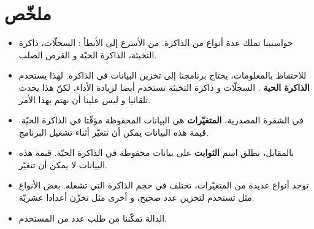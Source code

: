 \section*{ملخّص}
\begin{itemize}
  \item حواسيبنا تملك عدة أنواع من الذاكرة. من الأسرع إلى الأبطأ : السجلّات، ذاكرة التخبئة، الذاكرة الحيّة و القرص الصلب.
  \item للاحتفاظ بالمعلومات، يحتاج برنامجنا إلى تخزين البيانات في الذاكرة. لهذا يستخدم
\textbf{الذاكرة الحية}
. السجلّات و ذاكرة التخبئة تستخدم أيضا لزيادة الأداء، لكنّ هذا يحدث تلقائيا و ليس علينا أن نهتم بهذا الأمر.
  \item في الشفرة المصدرية،
\textbf{المتغيّرات}
هي البيانات المحفوظة مؤقّتا في الذاكرة الحيّة. قيمة هذه البيانات يمكن أن تتغيّر أثناء تشغيل البرنامج.
  \item بالمقابل، نطلق اسم
\textbf{الثوابت}
على بيانات محفوظة في الذاكرة الحيّة. قيمة هذه البيانات لا يمكن أن تتغيّر.
  \item توجد أنواع عديدة من المتغيّرات، تختلف في حجم الذاكرة التي تشغله. بعض الأنواع مثل
تستخدم لتخزين عدد صحيح، و أخرى مثل
تخزّن أعدادا عشريّة.
  \item الدالة
 تمكّننا من طلب عدد من المستخدم.
\end{itemize}
